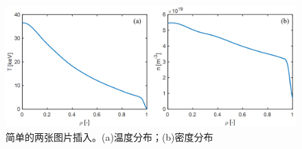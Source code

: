 \begin{figure}[h] 
	\centering
		\includegraphics[width=1\textwidth]{image/chap03/temperature_density.png}
		\caption{简单的两张图片插入。(a)温度分布；(b)密度分布}
		\label{fig:temperature_density}
\end{figure}